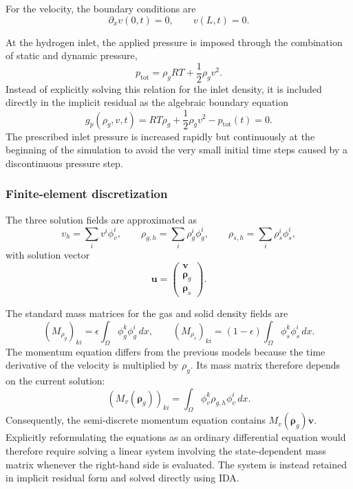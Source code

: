 For the velocity, the boundary conditions are
\begin{equation}
\partial_xv(0,t)=0,\qquad v(L,t)=0.
\end{equation}

At the hydrogen inlet, the applied pressure is imposed through the combination of static and dynamic pressure,
\begin{equation}
p_{\mathrm{tot}}=\rho_gRT+\frac{1}{2}\rho_gv^2.
\end{equation}
Instead of explicitly solving this relation for the inlet density, it is included directly in the implicit residual as the algebraic boundary equation
\begin{equation}\label{eq:model4_pressure_residual}
g_p(\rho_g,v,t)=RT\rho_g+\frac{1}{2}\rho_gv^2-p_{\mathrm{tot}}(t)=0.
\end{equation}
The prescribed inlet pressure is increased rapidly but continuously at the beginning of the simulation to avoid the very small initial time steps caused by a discontinuous pressure step.

\subsubsection{Finite-element discretization}

The three solution fields are approximated as
\begin{equation}
v_h=\sum_iv^i\phi_v^i,\qquad \rho_{g,h}=\sum_i\rho_g^i\phi_g^i,\qquad \rho_{s,h}=\sum_i\rho_s^i\phi_s^i,
\end{equation}
with solution vector
\begin{equation}
\mathbf u=\begin{pmatrix}\mathbf v\\\boldsymbol\rho_g\\\boldsymbol\rho_s\end{pmatrix}.
\end{equation}

The standard mass matrices for the gas and solid density fields are
\begin{equation}
(M_{\rho_g})_{ki}=\epsilon\int_\Omega\phi_g^k\phi_g^i\,dx,\qquad
(M_{\rho_s})_{ki}=(1-\epsilon)\int_\Omega\phi_s^k\phi_s^i\,dx.
\end{equation}
The momentum equation differs from the previous models because the time derivative of the velocity is multiplied by $\rho_g$. Its mass matrix therefore depends on the current solution:
\begin{equation}\label{eq:model4_Mv}
\left(M_v(\boldsymbol\rho_g)\right)_{ki}=\int_\Omega\phi_v^k\rho_{g,h}\phi_v^i\,dx.
\end{equation}
Consequently, the semi-discrete momentum equation contains $M_v(\boldsymbol\rho_g)\dot{\mathbf v}$. Explicitly reformulating the equations as an ordinary differential equation would therefore require solving a linear system involving the state-dependent mass matrix whenever the right-hand side is evaluated. The system is instead retained in implicit residual form and solved directly using IDA.

